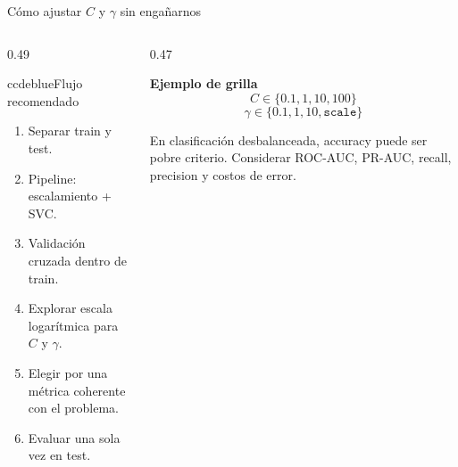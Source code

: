 \begin{frame}{Cómo ajustar $C$ y $\gamma$ sin engañarnos}
\small
\begin{columns}[T,onlytextwidth]
\begin{column}{0.49\textwidth}
\begin{contrastbox}{ccdeblue}{Flujo recomendado}
\small
\begin{enumerate}
  \item Separar train y test.
  \item Pipeline: escalamiento + SVC.
  \item Validación cruzada dentro de train.
  \item Explorar escala logarítmica para $C$ y $\gamma$.
  \item Elegir por una métrica coherente con el problema.
  \item Evaluar una sola vez en test.
\end{enumerate}
\end{contrastbox}
\end{column}
\begin{column}{0.47\textwidth}
\begin{keybox}
\textbf{Ejemplo de grilla}
\[
C\in\{0.1,1,10,100\}
\]
\[
\gamma\in\{0.1,1,10,\texttt{scale}\}
\]
\end{keybox}
\vspace{0.14cm}
\begin{ccdebox}
\small
En clasificación desbalanceada, accuracy puede ser pobre criterio. Considerar ROC-AUC, PR-AUC, recall, precision y costos de error.
\end{ccdebox}
\end{column}
\end{columns}
\end{frame}


